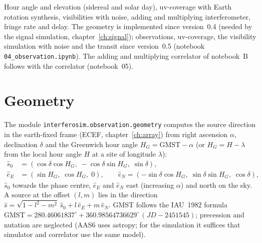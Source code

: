 \label{ch:observation}

Hour angle and elevation (sidereal and solar day), uv-coverage with
Earth rotation synthesis, visibilities with noise, adding and
multiplying interferometer, fringe rate and delay.
The geometry is implemented since version~0.4 (needed by the signal
simulation, chapter~\ref{ch:signal}); observations, uv-coverage, the
visibility simulation with noise and the transit since version~0.5
(notebook \texttt{04\_observation.ipynb}). The adding and multiplying
correlator of notebook~B follows with the correlator (notebook~05).

\section{Geometry}

The module \texttt{interferosim.observation.geometry} computes the source
direction in the earth-fixed frame (ECEF, chapter~\ref{ch:array}) from
right ascension $\alpha$, declination $\delta$ and the Greenwich hour angle
$H_G = \mathrm{GMST} - \alpha$ (or $H_G = H - \lambda$ from the local hour
angle $H$ at a site of longitude $\lambda$):
\begin{align}
  \hat s_0 &= (\cos\delta\cos H_G,\; -\cos\delta\sin H_G,\; \sin\delta),\\
  \hat e_E &= (\sin H_G,\; \cos H_G,\; 0),\qquad
  \hat e_N = (-\sin\delta\cos H_G,\; \sin\delta\sin H_G,\; \cos\delta),
\end{align}
$\hat s_0$ towards the phase centre, $\hat e_E$ and $\hat e_N$ east
(increasing $\alpha$) and north on the sky. A source at the offset $(l, m)$
lies in the direction $\hat s = \sqrt{1-l^2-m^2}\,\hat s_0 + l\,\hat e_E +
m\,\hat e_N$. GMST follows the IAU~1982 formula
$\mathrm{GMST} = 280.46061837^\circ + 360.98564736629^\circ\,(JD-2451545)$;
precession and nutation are neglected (AAS6 uses astropy; for the simulation
it suffices that simulator and correlator use the same model).

